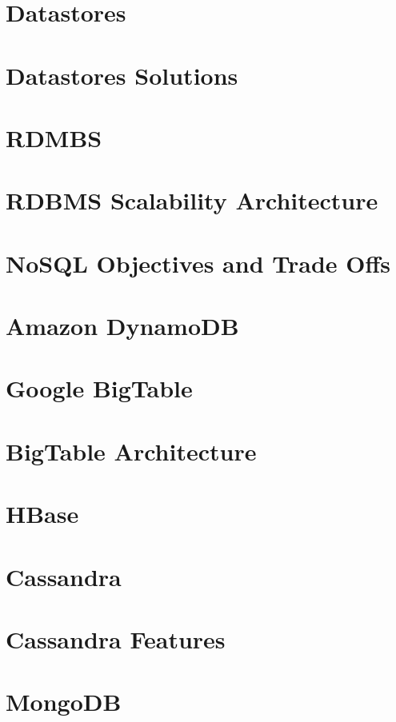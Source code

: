 \documentclass[11pt]{article}
\begin{document}
\section{Datastores}
    
\section{Datastores Solutions}

\section{RDMBS}

\section{RDBMS Scalability Architecture}

\section{NoSQL Objectives and Trade Offs}

\section{Amazon DynamoDB}

\section{Google BigTable}

\section{BigTable Architecture}

\section{HBase}

\section{Cassandra}

\section{Cassandra Features}

\section{MongoDB}
\end{document}
